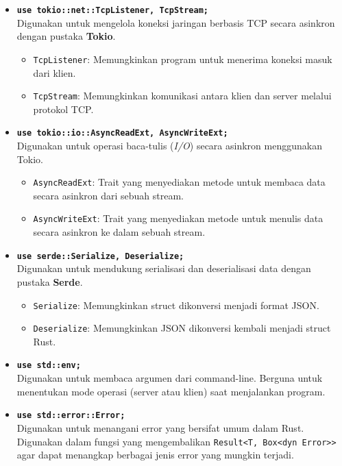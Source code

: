 \begin{itemize}
	\item \textbf{\texttt{use tokio::net::{TcpListener, TcpStream};}} \\
	Digunakan untuk mengelola koneksi jaringan berbasis TCP secara asinkron dengan pustaka \textbf{Tokio}. 
	\begin{itemize}
		\item \texttt{TcpListener}: Memungkinkan program untuk menerima koneksi masuk dari klien.
		\item \texttt{TcpStream}: Memungkinkan komunikasi antara klien dan server melalui protokol TCP.
	\end{itemize}
	
	\item \textbf{\texttt{use tokio::io::{AsyncReadExt, AsyncWriteExt};}} \\
	Digunakan untuk operasi baca-tulis (\textit{I/O}) secara asinkron menggunakan Tokio.
	\begin{itemize}
		\item \texttt{AsyncReadExt}: Trait yang menyediakan metode untuk membaca data secara asinkron dari sebuah stream.
		\item \texttt{AsyncWriteExt}: Trait yang menyediakan metode untuk menulis data secara asinkron ke dalam sebuah stream.
	\end{itemize}
	
	\item \textbf{\texttt{use serde::{Serialize, Deserialize};}} \\
	Digunakan untuk mendukung serialisasi dan deserialisasi data dengan pustaka \textbf{Serde}.
	\begin{itemize}
		\item \texttt{Serialize}: Memungkinkan struct dikonversi menjadi format JSON.
		\item \texttt{Deserialize}: Memungkinkan JSON dikonversi kembali menjadi struct Rust.
	\end{itemize}
	
	\item \textbf{\texttt{use std::env;}} \\
	Digunakan untuk membaca argumen dari command-line. Berguna untuk menentukan mode operasi (server atau klien) saat menjalankan program.
	
	\item \textbf{\texttt{use std::error::Error;}} \\
	Digunakan untuk menangani error yang bersifat umum dalam Rust. Digunakan dalam fungsi yang mengembalikan \texttt{Result<T, Box<dyn Error>>} agar dapat menangkap berbagai jenis error yang mungkin terjadi.
\end{itemize}



